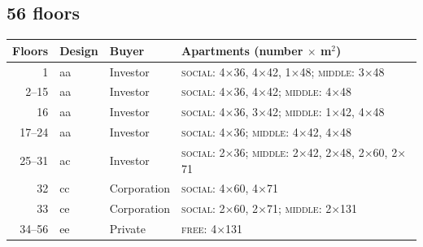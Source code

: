 \subsection*{56 floors}
\begin{tabular}{@{}r l l p{10.2cm}@{}}
\toprule
Floors & Design & Buyer & Apartments (number $\times$ m$^2$) \\
\midrule
1 & aa & Investor & \textsc{social}: 4$\times$36, 4$\times$42, 1$\times$48; \textsc{middle}: 3$\times$48 \\
2--15 & aa & Investor & \textsc{social}: 4$\times$36, 4$\times$42; \textsc{middle}: 4$\times$48 \\
16 & aa & Investor & \textsc{social}: 4$\times$36, 3$\times$42; \textsc{middle}: 1$\times$42, 4$\times$48 \\
17--24 & aa & Investor & \textsc{social}: 4$\times$36; \textsc{middle}: 4$\times$42, 4$\times$48 \\
25--31 & ac & Investor & \textsc{social}: 2$\times$36; \textsc{middle}: 2$\times$42, 2$\times$48, 2$\times$60, 2$\times$71 \\
32 & cc & Corporation & \textsc{social}: 4$\times$60, 4$\times$71 \\
33 & ce & Corporation & \textsc{social}: 2$\times$60, 2$\times$71; \textsc{middle}: 2$\times$131 \\
34--56 & ee & Private & \textsc{free}: 4$\times$131 \\
\bottomrule
\end{tabular}
